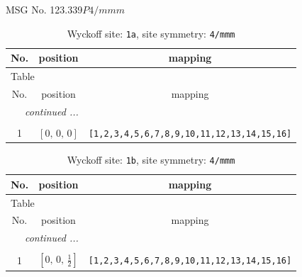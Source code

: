 \documentclass[fleqn,8pt]{jsarticle}
\begin{document}
\setcounter{MaxMatrixCols}{32}

\renewcommand{\tablename}{Table~}
\renewcommand{\figurename}{Figure~}
\begin{center}
\LARGE
MSG No. 123.339\quad$P4/mmm$
\end{center}
\renewcommand{\arraystretch}{1.2}
\begin{longtable}{ccc}
\caption{Wyckoff site: {\tt 1a}, site symmetry: {\tt 4/mmm}}
 \\
 \hline \hline
No. & position & mapping \\ \hline \endfirsthead

\multicolumn{2}{l}{\tablename\ \thetable{}} \\
 \hline \hline
No. & position & mapping \\ \hline \endhead

 \hline \hline
\multicolumn{2}{r}{\footnotesize\it continued ...} \\ \endfoot

 \hline \hline
\multicolumn{2}{r}{} \\ \endlastfoot

1 & $\left[ 0,\, 0,\, 0 \right]$ & {\tt [1,2,3,4,5,6,7,8,9,10,11,12,13,14,15,16]} \\
\end{longtable}
\renewcommand{\arraystretch}{1.2}
\begin{longtable}{ccc}
\caption{Wyckoff site: {\tt 1b}, site symmetry: {\tt 4/mmm}}
 \\
 \hline \hline
No. & position & mapping \\ \hline \endfirsthead

\multicolumn{2}{l}{\tablename\ \thetable{}} \\
 \hline \hline
No. & position & mapping \\ \hline \endhead

 \hline \hline
\multicolumn{2}{r}{\footnotesize\it continued ...} \\ \endfoot

 \hline \hline
\multicolumn{2}{r}{} \\ \endlastfoot

1 & $\left[ 0,\, 0,\, \frac{1}{2} \right]$ & {\tt [1,2,3,4,5,6,7,8,9,10,11,12,13,14,15,16]} \\
\end{longtable}
\renewcommand{\arraystretch}{1.2}
\end{document}
